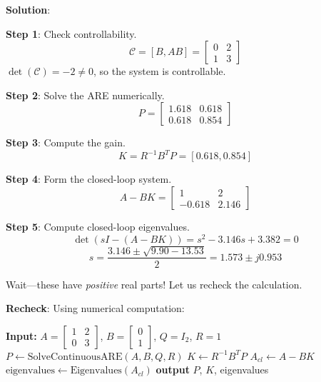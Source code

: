 \textbf{Solution}:

\textbf{Step 1}: Check controllability.
\begin{equation}
\mathcal{C} = [B, AB] = \begin{bmatrix} 0 & 2 \\ 1 & 3 \end{bmatrix}
\end{equation}
$\det(\mathcal{C}) = -2 \neq 0$, so the system is controllable.

\textbf{Step 2}: Solve the ARE numerically.
\begin{equation}
P = \begin{bmatrix} 1.618 & 0.618 \\ 0.618 & 0.854 \end{bmatrix}
\end{equation}

\textbf{Step 3}: Compute the gain.
\begin{equation}
K = R^{-1}B^T P = [0.618, 0.854]
\end{equation}

\textbf{Step 4}: Form the closed-loop system.
\begin{equation}
A - BK = \begin{bmatrix} 1 & 2 \\ -0.618 & 2.146 \end{bmatrix}
\end{equation}

\textbf{Step 5}: Compute closed-loop eigenvalues.
\begin{equation}
\det(sI - (A-BK)) = s^2 - 3.146s + 3.382 = 0
\end{equation}
\begin{equation}
s = \frac{3.146 \pm \sqrt{9.90 - 13.53}}{2} = 1.573 \pm j0.953
\end{equation}

Wait---these have \textit{positive} real parts! Let us recheck the calculation.

\textbf{Recheck}: Using numerical computation:

\begin{algorithm}[H]
\caption{Verify ARE Solution for Unstable System}
\begin{algorithmic}[1]
\State \textbf{Input:} $A = \begin{bmatrix} 1 & 2 \\ 0 & 3 \end{bmatrix}$, $B = \begin{bmatrix} 0 \\ 1 \end{bmatrix}$, $Q = I_2$, $R = 1$
\State $P \gets \text{SolveContinuousARE}(A, B, Q, R)$
\State $K \gets R^{-1} B^T P$
\State $A_{cl} \gets A - B K$
\State $\text{eigenvalues} \gets \text{Eigenvalues}(A_{cl})$
\State \textbf{output} $P$, $K$, eigenvalues
\end{algorithmic}
\end{algorithm}

